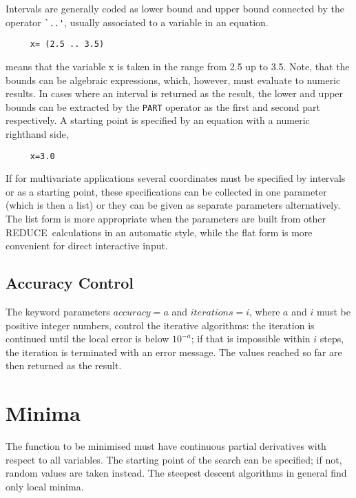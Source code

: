 \documentclass[11pt,letterpaper]{book}
\newcommand{\REDUCE}{REDUCE}
\begin{document}
Intervals are generally coded as lower bound and
upper bound connected by the operator \verb+`..'+, usually
associated to a variable in an
equation.

{\small\begin{verbatim}
     x= (2.5 .. 3.5)
\end{verbatim}}

means that the variable x is taken in the range from 2.5 up to
3.5. Note, that the bounds can be algebraic
expressions, which, however, must evaluate to numeric results.
In cases where an interval is returned as the result, the lower
and upper bounds can be extracted by the \verb+PART+ operator
as the first and second part respectively.
A starting point is specified by an equation with a numeric
righthand side,

{\small\begin{verbatim}
     x=3.0
\end{verbatim}}

If for multivariate applications several coordinates must be
specified by intervals or as a starting point, these
specifications can be collected in one parameter (which is then
a list) or they can be given as separate parameters
alternatively.  The list form is more appropriate when the
parameters are built from other \REDUCE\ calculations in an
automatic style, while the flat form is more convenient
for direct interactive input.

\subsection{Accuracy Control}

The keyword parameters $accuracy=a$ and $iterations=i$, where
$a$ and $i$ must be positive integer numbers, control the
iterative algorithms: the iteration is continued until
the local error is below $10^{-a}$; if that is impossible
within $i$ steps, the iteration is terminated with an
error message.  The values reached so far are then returned
as the result.

\section{Minima}

The function to be minimised must have continuous partial derivatives
with respect to all variables.  The starting point of the search can
be specified; if not, random values are taken instead.  The steepest
descent algorithms in general find only local minima.
\end{document}
